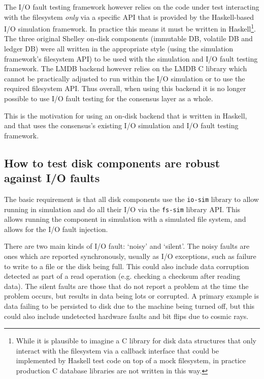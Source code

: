 \documentclass[11pt,a4paper]{article}
\begin{document}
The I/O fault testing framework however relies on the code under test
interacting with the filesystem \emph{only} via a specific API that is provided by the Haskell-based I/O simulation framework. In practice this means it must
be written in Haskell\footnote{While it is plausible to imagine a C library for
disk data structures that only interact with the filesystem via a callback
interface that could be implemented by Haskell test code on top of a mock
filesystem, in practice production C database libraries are not written in this
way.}. The three original Shelley on-disk components (immutable DB, volatile DB
and ledger DB) were all written in the appropriate style (using the simulation
framework's filesystem API) to be used with the simulation and I/O fault testing
framework. The LMDB backend however relies on the LMDB C library which cannot
be practically adjusted to run within the I/O simulation or to use the required
filesystem API. Thus overall, when using this backend it is no longer possible
to use I/O fault testing for the consensus layer as a whole.

This is the motivation for using an on-disk backend that is written in Haskell,
and that uses the consensus's existing I/O simulation and I/O fault testing
framework.

\subsection{How to test disk components are robust against I/O faults}
\label{sec:how-to-test-disk-components-are-robust-against-io-faults}

The basic requirement is that all disk components use the \texttt{io-sim}
library to allow running in simulation and do all their I/O via the
\texttt{fs-sim} library API. This allows running the component in simulation
with a simulated file system, and allows for the I/O fault injection.

There are two main kinds of I/O fault: `noisy' and `silent'. The noisy faults
are ones which are reported synchronously, usually as I/O exceptions, such as
failure to write to a file or the disk being full. This could also include
data corruption detected as part of a read operation (e.g. checking a checksum
after reading data). The silent faults are those that do not report a problem
at the time the problem occurs, but results in data being lots or corrupted.
A primary example is data failing to be persisted to disk due to the machine
being turned off, but this could also include undetected hardware faults and
bit flips due to cosmic rays.
\end{document}
